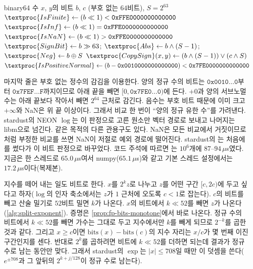 \begin{algorithm}[htbp]
\begin{algorithmic}[1]
\Require binary64 수 $x$, $y$의 비트 $b$, $c$ (부호 없는 $64$비트), $S=2^{63}$
\State $\textproc{IsFinite}\gets(b\ll1)<\mathtt{0xFFE0000000000000}$ 
\State $\textproc{IsInf}\gets(b\ll1)=\mathtt{0xFFE0000000000000}$ 
\State $\textproc{IsNaN}\gets(b\ll1)>\mathtt{0xFFE0000000000000}$
\State $\textproc{SignBit}\gets b\gg63$; $\textproc{Abs}\gets b\wedge(S-1)$; $\textproc{Neg}\gets b\oplus S$
\State $\textproc{CopySign}(x,y)\gets(b\wedge(S-1))\vee(c\wedge S)$
\State $\textproc{IsPositiveNormal}\gets(b-\mathtt{0x0010000000000000})<\mathtt{0x7FE0000000000000}$ 
\end{algorithmic}
\caption{비트로 하는 분류와 부호 연산 (stardust , ). $\ll$, $\gg$는 논리 밀기이고 비교는 부호 없는 정수의 비교이다.}
\label{alg:bit-predicates}
\end{algorithm}

마지막 줄은 부호 없는 정수의 감김을 이용한다. 양의 정규 수의 비트는 $\mathtt{0x0010\ldots0}$부터 $\mathtt{0x7FEF\ldots F}$까지이므로 아래 끝을 빼면 $[0,\mathtt{0x7FE0\ldots0})$에 든다. $+0$과 양의 서브노멀 수는 아래 끝보다 작아서 빼면 $2^{64}$ 근처로 감긴다. 음수는 부호 비트 때문에 이미 크고 $+\infty$와 NaN은 위 끝 이상이다. 그래서 비교 한 번이 ``양의 정규 유한 수''를 가려낸다. stardust의 NEON $\log$는 이 판정으로 고른 원소만 벡터 경로로 보내고 나머지는 libm으로 넘긴다. 같은 목적의 다른 관용구도 있다. NaN은 모든 비교에서 거짓이므로 처럼 부정한 비교를 쓰면 NaN이 저절로 예외 경로에 떨어진다. stardust의 는 처음에 를 썼다가 이 비트 판정으로 바꾸었다. 코드 주석에 따르면 는 $10^6$개에 $87$--$94\,\mu$s였다. 지금은 한 스레드로 $65.0\,\mu$s여서 numpy($65.1\,\mu$s)와 같고 기본 스레드 설정에서는 $17.2\,\mu$s이다(복제본).

지수를 떼어 내는 일도 비트로 한다. $x$를 $2^kz$로 나누고 $z$를 어떤 구간 $[c,2c)$에 두고 싶다고 하자($\log$의 인자 축소에서는 $z$가 $1$ 근처에 오도록 $c<1$로 잡는다). $c$의 비트를 빼고 산술 밀기로 $52$비트 밀면 $k$가 나온다. $x$의 비트에서 $k\ll52$를 빼면 $z$가 나온다(\cref{alg:split-exponent}). 증명은 \cref{prop:fp-bits-monotone}에서 바로 나온다. 정규 수의 비트에서 $k\ll52$를 빼면 가수는 그대로 두고 지수에서만 $k$를 빼게 되므로 $2^{-k}$를 곱한 것과 같다. 그리고 $x\ge c$이면 $\mathrm{bits}(x)-\mathrm{bits}(c)$의 지수 자리는 $x/c$가 몇 번째 이진 구간인지를 센다. 반대로 $2^k$를 곱하려면 비트에 $k\ll52$를 더하면 되는데 결과가 정규 수로 남는 동안만 맞다. 그래서 stardust의 $\exp$는 $|x|\le708$일 때만 이 덧셈을 쓴다($e^{\pm708}$과 그 앞뒤의 $2^{k+j/128}$이 정규 수로 남는다).

